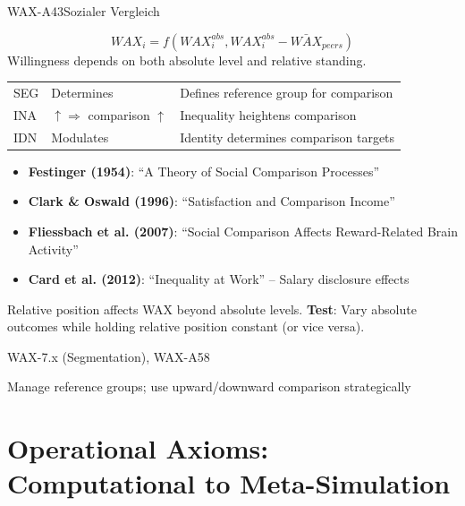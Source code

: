\begin{axiomspec}{WAX-A43}{Sozialer Vergleich}

\begin{equation}
WAX_i = f(WAX_i^{abs}, WAX_i^{abs} - \bar{WAX}_{peers})
\end{equation}
Willingness depends on both absolute level and relative standing.

\begin{tabular}{lll}
SEG & Determines & Defines reference group for comparison \\
INA & $\uparrow \Rightarrow$ comparison $\uparrow$ & Inequality heightens comparison \\
IDN & Modulates & Identity determines comparison targets \\
\end{tabular}

\begin{itemize}
\item \textbf{Festinger (1954)}: ``A Theory of Social Comparison Processes''
\item \textbf{Clark \& Oswald (1996)}: ``Satisfaction and Comparison Income''
\item \textbf{Fliessbach et al. (2007)}: ``Social Comparison Affects Reward-Related Brain Activity''
\item \textbf{Card et al. (2012)}: ``Inequality at Work'' -- Salary disclosure effects
\end{itemize}

Relative position affects WAX beyond absolute levels.
\textbf{Test}: Vary absolute outcomes while holding relative position constant (or vice versa).

WAX-7.x (Segmentation), WAX-A58

Manage reference groups; use upward/downward comparison strategically

\end{axiomspec}



\section{Operational Axioms: Computational to Meta-Simulation}
\label{sec:av-operational-4-12}


